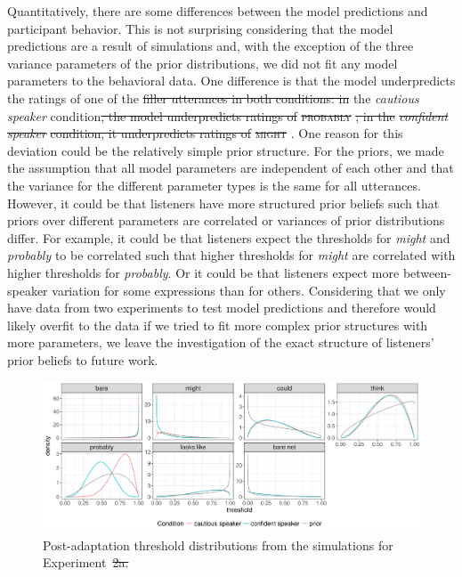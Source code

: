 \documentclass[man, floatsintext]{apa6}
\providecommand{\DIFadd}[1]{{\protect\color{blue}\uwave{#1}}} %
\providecommand{\DIFdel}[1]{{\protect\color{red}\sout{#1}}}                      %
\providecommand{\DIFaddbegin}{} %
\providecommand{\DIFaddend}{} %
\providecommand{\DIFdelbegin}{} %
\providecommand{\DIFdelend}{} %
\providecommand{\DIFaddFL}[1]{\DIFadd{#1}} %
\providecommand{\DIFdelFL}[1]{\DIFdel{#1}} %
\providecommand{\DIFaddbeginFL}{} %
\providecommand{\DIFaddendFL}{} %
\providecommand{\DIFdelbeginFL}{} %
\providecommand{\DIFdelendFL}{} %
\newcommand{\DIFscaledelfig}{0.5}
\newlength{\DIFdelgraphicswidth} %
\newlength{\DIFdelgraphicsheight} %
\newcommand{\DIFaddincludegraphics}[2][]{{\color{blue}\fbox{\DIFOincludegraphics[#1]{#2}}}} %
\newcommand{\DIFdelincludegraphics}[2][]{%
\sbox{\DIFdelgraphicsbox}{\DIFOincludegraphics[#1]{#2}}%
\settoboxwidth{\DIFdelgraphicswidth}{\DIFdelgraphicsbox} %
\settoboxtotalheight{\DIFdelgraphicsheight}{\DIFdelgraphicsbox} %
\scalebox{\DIFscaledelfig}{%
\parbox[b]{\DIFdelgraphicswidth}{\usebox{\DIFdelgraphicsbox}\\[-\baselineskip] \rule{\DIFdelgraphicswidth}{0em}}\llap{\resizebox{\DIFdelgraphicswidth}{\DIFdelgraphicsheight}{%
\setlength{\unitlength}{\DIFdelgraphicswidth}%
\begin{picture}(1,1)%
\thicklines\linethickness{2pt} %
{\color[rgb]{1,0,0}\put(0,0){\framebox(1,1){}}}%
{\color[rgb]{1,0,0}\put(0,0){\line( 1,1){1}}}%
{\color[rgb]{1,0,0}\put(0,1){\line(1,-1){1}}}%
\end{picture}%
}\hspace*{3pt}}} %
} %
\DeclareRobustCommand{\DIFaddbegin}{\DIFOaddbegin \let\includegraphics\DIFaddincludegraphics} %
\DeclareRobustCommand{\DIFaddend}{\DIFOaddend \let\includegraphics\DIFOincludegraphics} %
\DeclareRobustCommand{\DIFdelbegin}{\DIFOdelbegin \let\includegraphics\DIFdelincludegraphics} %
\DeclareRobustCommand{\DIFdelend}{\DIFOaddend \let\includegraphics\DIFOincludegraphics} %
\DeclareRobustCommand{\DIFaddbeginFL}{\DIFOaddbeginFL \let\includegraphics\DIFaddincludegraphics} %
\DeclareRobustCommand{\DIFaddendFL}{\DIFOaddendFL \let\includegraphics\DIFOincludegraphics} %
\DeclareRobustCommand{\DIFdelbeginFL}{\DIFOdelbeginFL \let\includegraphics\DIFdelincludegraphics} %
\DeclareRobustCommand{\DIFdelendFL}{\DIFOaddendFL \let\includegraphics\DIFOincludegraphics} %
\begin{document}
Quantitatively, there are some differences between the model predictions and participant behavior. This is not surprising considering that the model predictions are a result of simulations
and, with the exception of the three variance parameters of the prior distributions, we did not fit any model parameters to the behavioral data. One difference is that the model underpredicts 
the ratings of one of the  \DIFdelbegin \DIFdel{filler utterances in both conditions: in }\DIFdelend \DIFaddbegin \textsc{\DIFadd{probably}} \DIFadd{utterances in }\DIFaddend the \textit{cautious speaker} condition\DIFdelbegin \DIFdel{, the model underpredicts ratings of }\textsc{\DIFdel{probably}}%
\DIFdel{; in the }\textit{\DIFdel{confident speaker}} %
\DIFdel{condition, it underpredicts
ratings of }\textsc{\DIFdel{might}}%
\DIFdelend .
 One reason for this deviation could be the relatively simple prior structure. For the priors, we made the assumption that all model parameters are independent of each other and 
that the variance for the different parameter types is the same for all utterances. However, it could be that listeners have more structured prior beliefs such that priors over different parameters are correlated or
variances of prior distributions differ. For example, it could be that listeners expect the thresholds for \textit{might} and \textit{probably} to be correlated such that higher thresholds for \textit{might} are correlated 
with higher thresholds for \textit{probably}. Or it could be that listeners expect more between-speaker variation for some expressions than for others. Considering that we only have data from two experiments to test
model predictions and therefore would likely overfit to the data if we tried to fit more complex prior structures with more parameters, we leave the investigation of the exact structure of listeners' prior beliefs to future work.

\begin{figure}
  \DIFdelbeginFL %
\DIFdelendFL \DIFaddbeginFL \includegraphics[width=\textwidth]{plots/adaptation-posterior-thresholds-replication.pdf}
  \DIFaddendFL \caption{Post-adaptation threshold distributions from the simulations for Experiment~\DIFdelbeginFL \DIFdelFL{2a. }\DIFdelendFL \DIFaddbeginFL \DIFaddFL{2. }\DIFaddendFL \label{fig:post-exposure-thresholds}}
\end{figure}
\end{document}

